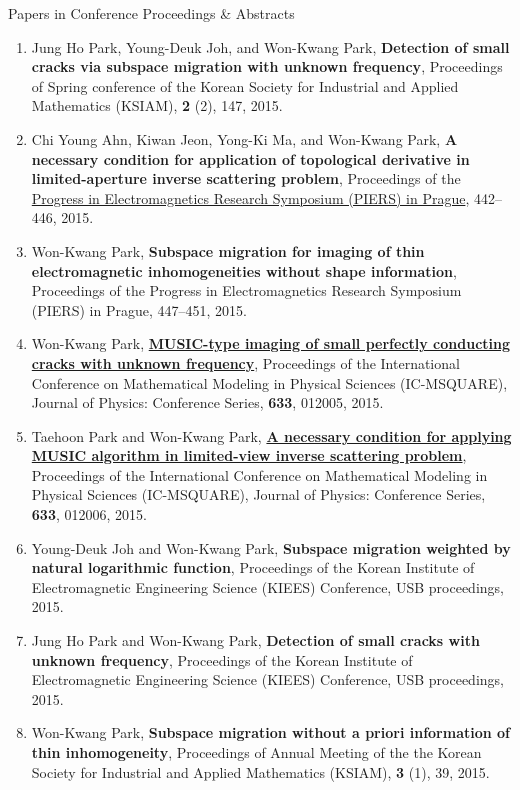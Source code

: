 \documentclass{resume} %
\begin{document}
\begin{rSection}{Papers in Conference Proceedings \& Abstracts}
\begin{enumerate}
\item\label{C-KSIAM2015B} Jung Ho Park, Young-Deuk Joh, and Won-Kwang Park, \textbf{Detection of small cracks via subspace migration with unknown frequency}, Proceedings of Spring conference of the Korean Society for Industrial and Applied Mathematics (KSIAM), \textbf{2} (2), 147, 2015.
\item\label{C-PIERS2015A} Chi Young Ahn, Kiwan Jeon, Yong-Ki Ma, and Won-Kwang Park, \textbf{A necessary condition for application of topological derivative in limited-aperture inverse scattering problem}, Proceedings of the \href{http://www.piers.org/piers2015Prague/}{Progress in Electromagnetics Research Symposium (PIERS) in Prague}, 442--446, 2015.
\item\label{C-PIERS2015B} Won-Kwang Park, \textbf{Subspace migration for imaging of thin electromagnetic inhomogeneities without shape information}, Proceedings of the Progress in Electromagnetics Research Symposium (PIERS) in Prague, 447--451, 2015.
\item\label{C-ICMSQUARE2015A} Won-Kwang Park, \href{http://dx.doi.org/10.1088/1742-6596/633/1/012005}{\textbf{MUSIC-type imaging of small perfectly conducting cracks with unknown frequency}}, Proceedings of the International Conference on Mathematical Modeling in Physical Sciences (IC-MSQUARE), Journal of Physics: Conference Series, \textbf{633}, 012005, 2015.
\item\label{C-ICMSQUARE2015B} Taehoon Park and Won-Kwang Park, \href{http://dx.doi.org/10.1088/1742-6596/633/1/012006}{\textbf{A necessary condition for applying MUSIC algorithm in limited-view inverse scattering problem}}, Proceedings of the International Conference on Mathematical Modeling in Physical Sciences (IC-MSQUARE), Journal of Physics: Conference Series, \textbf{633}, 012006, 2015.
\item\label{C-KIEES2015A} Young-Deuk Joh and Won-Kwang Park, \textbf{Subspace migration weighted by natural logarithmic function}, Proceedings of the Korean Institute of Electromagnetic Engineering Science (KIEES) Conference, USB proceedings, 2015.
\item\label{C-KIEES2015B} Jung Ho Park and Won-Kwang Park, \textbf{Detection of small cracks with unknown frequency}, Proceedings of the Korean Institute of Electromagnetic Engineering Science (KIEES) Conference, USB proceedings, 2015.
\item\label{C-KSIAM2015C} Won-Kwang Park, \textbf{Subspace migration without a priori information of thin inhomogeneity}, Proceedings of Annual Meeting of the the Korean Society for Industrial and Applied Mathematics (KSIAM), \textbf{3} (1), 39, 2015.

\end{enumerate}
\end{rSection}
\end{document}
